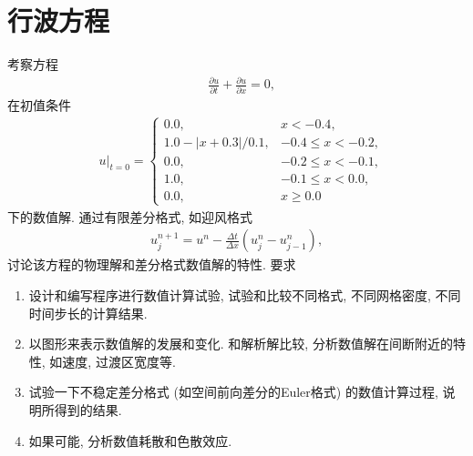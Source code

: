 \documentclass[10.5pt
]{article}
\begin{document}
\section{行波方程}
考察方程
\begin{align}
& \frac{\partial u}{\partial t} + \frac{\partial u}{\partial x} = 0,
\label{EqnCon}
\end{align}
在初值条件
\begin{align}
& u|_{t=0} = \left\{\begin{array}{ll} 0.0, & x < -0.4, \\
1.0 - |x + 0.3| / 0.1, & -0.4 \le x < -0.2, \\
0.0, & -0.2 \le x < -0.1, \\
1.0 , & -0.1 \le x < 0.0, \\
0.0, & x \ge 0.0
\end{array}\right.
\end{align}
下的数值解. 通过有限差分格式, 如迎风格式
\begin{align}
u_j^{n+1} = u^n - \frac{\Delta t}{\Delta x} (u_j^n - u_{j-1}^n), \label{EqnUpwind}
\end{align}
讨论该方程的物理解和差分格式数值解的特性. 要求
\begin{enumerate}
\item 设计和编写程序进行数值计算试验, 试验和比较不同格式, 不同网格密度, 不同时间步长的计算结果.
\item 以图形来表示数值解的发展和变化. 和解析解比较, 分析数值解在间断附近的特性, 如速度, 过渡区宽度等.
\item 试验一下不稳定差分格式 (如空间前向差分的Euler格式) 的数值计算过程, 说明所得到的结果.
\item 如果可能, 分析数值耗散和色散效应.
\end{enumerate}
\end{document}
